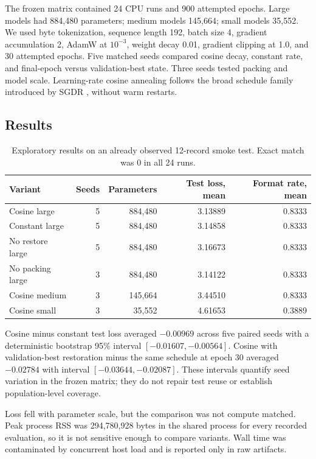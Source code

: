 \documentclass[10pt]{article}
\begin{document}
The frozen matrix contained 24 CPU runs and 900 attempted epochs. Large models had
884,480 parameters; medium models 145,664; small models 35,552. We used byte tokenization,
sequence length 192, batch size 4, gradient accumulation 2, AdamW at $10^{-3}$, weight
decay 0.01, gradient clipping at 1.0, and 30 attempted epochs. Five matched seeds compared
cosine decay, constant rate, and final-epoch versus validation-best state. Three seeds
tested packing and model scale. Learning-rate cosine annealing follows the broad schedule
family introduced by SGDR \cite{loshchilov2016sgdr}, without warm restarts.

\subsection{Results}
\begin{table}[H]
\centering
\small
\begin{tabular}{lrrrr}
\toprule
Variant & Seeds & Parameters & Test loss, mean & Format rate, mean\\
\midrule
Cosine large & 5 & 884,480 & 3.13889 & 0.8333\\
Constant large & 5 & 884,480 & 3.14858 & 0.8333\\
No restore large & 5 & 884,480 & 3.16673 & 0.8333\\
No packing large & 3 & 884,480 & 3.14122 & 0.8333\\
Cosine medium & 3 & 145,664 & 3.44510 & 0.8333\\
Cosine small & 3 & 35,552 & 4.61653 & 0.3889\\
\bottomrule
\end{tabular}
\caption{Exploratory results on an already observed 12-record smoke test. Exact match was
0 in all 24 runs.}
\label{tab:results}
\end{table}

Cosine minus constant test loss averaged $-0.00969$ across five paired seeds with a
deterministic bootstrap 95\% interval $[-0.01607,-0.00564]$. Cosine with validation-best
restoration minus the same schedule at epoch 30 averaged $-0.02784$ with interval
$[-0.03644,-0.02087]$. These intervals quantify seed variation in the frozen matrix; they
do not repair test reuse or establish population-level coverage.

Loss fell with parameter scale, but the comparison was not compute matched. Peak process
RSS was 294,780,928 bytes in the shared process for every recorded evaluation, so it is
not sensitive enough to compare variants. Wall time was contaminated by concurrent host
load and is reported only in raw artifacts.
\end{document}
